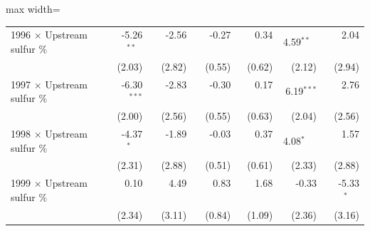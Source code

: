 \begin{table}[htbp]
{\begin{adjustbox}{max width=\linewidth}
\begin{tabular}{lrrrrrr}
1996 $\times$ Upstream sulfur \% & \phantom{(}-5.26$^{**\phantom{*}}$ & \phantom{(}-2.56$^{\phantom{*}\phantom{*}\phantom{*}}$ & \phantom{(}-0.27$^{\phantom{*}\phantom{*}\phantom{*}}$ & \phantom{(}\phantom{-}0.34$^{\phantom{*}\phantom{*}\phantom{*}}$ & \phantom{(}\phantom{-}4.59$^{**\phantom{*}}$ & \phantom{(}\phantom{-}2.04$^{\phantom{*}\phantom{*}\phantom{*}}$ \\
 & (\phantom{-}2.03)\phantom{$^{***}$} & (\phantom{-}2.82)\phantom{$^{***}$} & (\phantom{-}0.55)\phantom{$^{***}$} & (\phantom{-}0.62)\phantom{$^{***}$} & (\phantom{-}2.12)\phantom{$^{***}$} & (\phantom{-}2.94)\phantom{$^{***}$} \\
1997 $\times$ Upstream sulfur \% & \phantom{(}-6.30$^{***}$ & \phantom{(}-2.83$^{\phantom{*}\phantom{*}\phantom{*}}$ & \phantom{(}-0.30$^{\phantom{*}\phantom{*}\phantom{*}}$ & \phantom{(}\phantom{-}0.17$^{\phantom{*}\phantom{*}\phantom{*}}$ & \phantom{(}\phantom{-}6.19$^{***}$ & \phantom{(}\phantom{-}2.76$^{\phantom{*}\phantom{*}\phantom{*}}$ \\
 & (\phantom{-}2.00)\phantom{$^{***}$} & (\phantom{-}2.56)\phantom{$^{***}$} & (\phantom{-}0.55)\phantom{$^{***}$} & (\phantom{-}0.63)\phantom{$^{***}$} & (\phantom{-}2.04)\phantom{$^{***}$} & (\phantom{-}2.56)\phantom{$^{***}$} \\
1998 $\times$ Upstream sulfur \% & \phantom{(}-4.37$^{*\phantom{*}\phantom{*}}$ & \phantom{(}-1.89$^{\phantom{*}\phantom{*}\phantom{*}}$ & \phantom{(}-0.03$^{\phantom{*}\phantom{*}\phantom{*}}$ & \phantom{(}\phantom{-}0.37$^{\phantom{*}\phantom{*}\phantom{*}}$ & \phantom{(}\phantom{-}4.08$^{*\phantom{*}\phantom{*}}$ & \phantom{(}\phantom{-}1.57$^{\phantom{*}\phantom{*}\phantom{*}}$ \\
 & (\phantom{-}2.31)\phantom{$^{***}$} & (\phantom{-}2.88)\phantom{$^{***}$} & (\phantom{-}0.51)\phantom{$^{***}$} & (\phantom{-}0.61)\phantom{$^{***}$} & (\phantom{-}2.33)\phantom{$^{***}$} & (\phantom{-}2.88)\phantom{$^{***}$} \\
1999 $\times$ Upstream sulfur \% & \phantom{(}\phantom{-}0.10$^{\phantom{*}\phantom{*}\phantom{*}}$ & \phantom{(}\phantom{-}4.49$^{\phantom{*}\phantom{*}\phantom{*}}$ & \phantom{(}\phantom{-}0.83$^{\phantom{*}\phantom{*}\phantom{*}}$ & \phantom{(}\phantom{-}1.68$^{\phantom{*}\phantom{*}\phantom{*}}$ & \phantom{(}-0.33$^{\phantom{*}\phantom{*}\phantom{*}}$ & \phantom{(}-5.33$^{*\phantom{*}\phantom{*}}$ \\
 & (\phantom{-}2.34)\phantom{$^{***}$} & (\phantom{-}3.11)\phantom{$^{***}$} & (\phantom{-}0.84)\phantom{$^{***}$} & (\phantom{-}1.09)\phantom{$^{***}$} & (\phantom{-}2.36)\phantom{$^{***}$} & (\phantom{-}3.16)\phantom{$^{***}$} \\

\end{tabular}
\end{adjustbox}}
\end{table}
